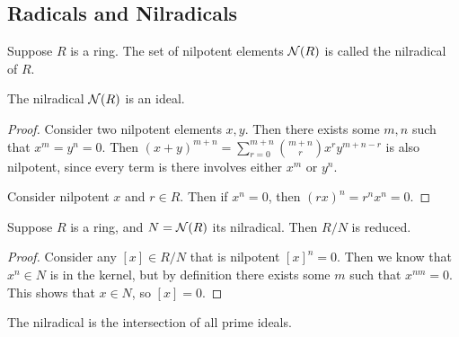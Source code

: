 \subsection*{Radicals and Nilradicals}

\begin{definition}
    Suppose \(R\) is a ring.
    The set of nilpotent elements \(\operatorname{\mathcal{N}}(R)\) is called the nilradical of \(R\).
\end{definition}
\begin{lemma}
    The nilradical \(\operatorname{\mathcal{N}}(R)\) is an ideal.
\end{lemma}
\begin{proof}
    Consider two nilpotent elements \(x,y\).
    Then there exists some \(m,n\) such that \(x^m = y^n = 0\).
    Then \({(x+y)}^{m+n} = \sum_{r=0}^{m+n} \binom{m+n}{r} x^r y^{m+n-r}\) is also nilpotent,
    since every term is there involves either \(x^m\) or \(y^n\).

    Consider nilpotent \(x\) and \(r \in R\).
    Then if \(x^n = 0\), then \({(rx)}^n = r^n x^n = 0\).
\end{proof}
\begin{theorem}
    Suppose \(R\) is a ring, and \(N = \operatorname{\mathcal{N}}(R)\) its nilradical.
    Then \(R/N\) is reduced.
\end{theorem}
\begin{proof}
    Consider any \([x] \in R/N\) that is nilpotent \({[x]}^n = 0\).
    Then we know that \(x^n \in N\) is in the kernel,
    but by definition there exists some \(m\) such that \(x^{nm} = 0\).
    This shows that \(x \in N\), so \([x] = 0\).
\end{proof}
\begin{theorem}\label{thm:nilradical-intersection-prime}
    The nilradical is the intersection of all prime ideals.
\end{theorem}
